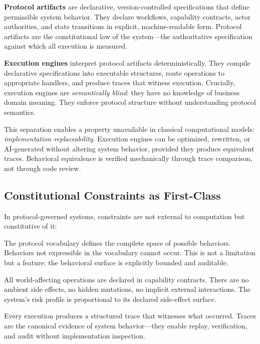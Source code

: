 \documentclass[11pt,a4paper]{article}
\begin{document}
\textbf{Protocol artifacts} are declarative, version-controlled specifications that define permissible system behavior. They declare workflows, capability contracts, actor authorities, and state transitions in explicit, machine-readable form. Protocol artifacts are the constitutional law of the system---the authoritative specification against which all execution is measured.

\textbf{Execution engines} interpret protocol artifacts deterministically. They compile declarative specifications into executable structures, route operations to appropriate handlers, and produce traces that witness execution. Crucially, execution engines are \emph{semantically blind}: they have no knowledge of business domain meaning. They enforce protocol structure without understanding protocol semantics.

This separation enables a property unavailable in classical computational models: \emph{implementation replaceability}. Execution engines can be optimized, rewritten, or AI-generated without altering system behavior, provided they produce equivalent traces. Behavioral equivalence is verified mechanically through trace comparison, not through code review.

\subsection{Constitutional Constraints as First-Class}

In protocol-governed systems, constraints are not external to computation but constitutive of it:

\begin{description}[nosep]
    \item[Vocabulary-Bounded Behavior.] The protocol vocabulary defines the complete space of possible behaviors. Behaviors not expressible in the vocabulary cannot occur. This is not a limitation but a feature: the behavioral surface is explicitly bounded and auditable.

    \item[Explicit Side-Effect Surfaces.] All world-affecting operations are declared in capability contracts. There are no ambient side effects, no hidden mutations, no implicit external interactions. The system's risk profile is proportional to its declared side-effect surface.

    \item[Trace-Based Verification.] Every execution produces a structured trace that witnesses what occurred. Traces are the canonical evidence of system behavior---they enable replay, verification, and audit without implementation inspection.
\end{description}
\end{document}
